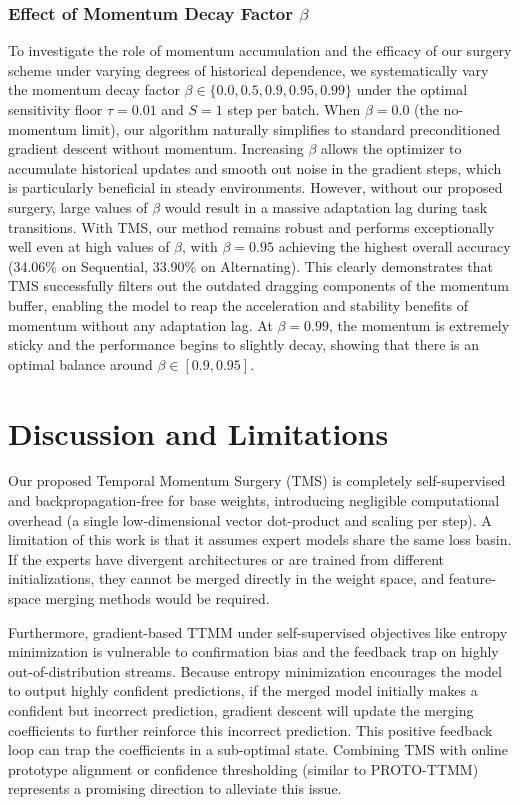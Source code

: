 \documentclass{article}
\theoremstyle{plain}
\theoremstyle{definition}
\theoremstyle{remark}
\begin{document}
\subsubsection{Effect of Momentum Decay Factor $\beta$}
To investigate the role of momentum accumulation and the efficacy of our surgery scheme under varying degrees of historical dependence, we systematically vary the momentum decay factor $\beta \in \{0.0, 0.5, 0.9, 0.95, 0.99\}$ under the optimal sensitivity floor $\tau = 0.01$ and $S = 1$ step per batch.
When $\beta = 0.0$ (the no-momentum limit), our algorithm naturally simplifies to standard preconditioned gradient descent without momentum.
Increasing $\beta$ allows the optimizer to accumulate historical updates and smooth out noise in the gradient steps, which is particularly beneficial in steady environments.
However, without our proposed surgery, large values of $\beta$ would result in a massive adaptation lag during task transitions.
With TMS, our method remains robust and performs exceptionally well even at high values of $\beta$, with $\beta = 0.95$ achieving the highest overall accuracy (34.06\% on Sequential, 33.90\% on Alternating). This clearly demonstrates that TMS successfully filters out the outdated dragging components of the momentum buffer, enabling the model to reap the acceleration and stability benefits of momentum without any adaptation lag. At $\beta = 0.99$, the momentum is extremely sticky and the performance begins to slightly decay, showing that there is an optimal balance around $\beta \in [0.9, 0.95]$.

\section{Discussion and Limitations}
\label{sec:discussion}
Our proposed Temporal Momentum Surgery (TMS) is completely self-supervised and backpropagation-free for base weights, introducing negligible computational overhead (a single low-dimensional vector dot-product and scaling per step). A limitation of this work is that it assumes expert models share the same loss basin. If the experts have divergent architectures or are trained from different initializations, they cannot be merged directly in the weight space, and feature-space merging methods would be required.

Furthermore, gradient-based TTMM under self-supervised objectives like entropy minimization is vulnerable to confirmation bias and the feedback trap on highly out-of-distribution streams. Because entropy minimization encourages the model to output highly confident predictions, if the merged model initially makes a confident but incorrect prediction, gradient descent will update the merging coefficients to further reinforce this incorrect prediction. This positive feedback loop can trap the coefficients in a sub-optimal state. Combining TMS with online prototype alignment or confidence thresholding (similar to PROTO-TTMM) represents a promising direction to alleviate this issue.
\end{document}
